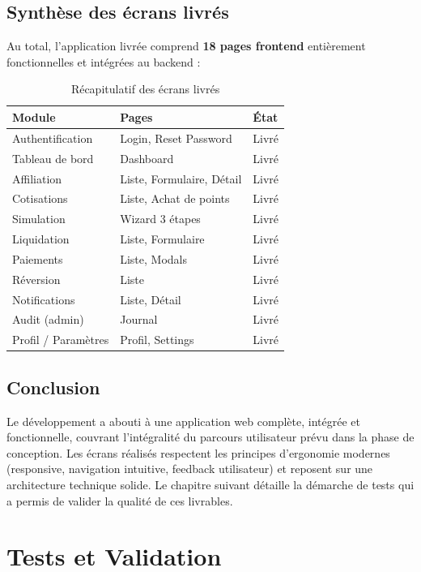 \documentclass[12pt,a4paper,oneside]{report}
\begin{document}
\section{Synthèse des écrans livrés}

Au total, l'application livrée comprend \textbf{18 pages frontend} entièrement fonctionnelles et intégrées au backend :

\begin{table}[H]
\centering
\caption{Récapitulatif des écrans livrés}
\begin{tabular}{lll}
\toprule
\textbf{Module} & \textbf{Pages} & \textbf{État} \\
\midrule
Authentification & Login, Reset Password & Livré \\
Tableau de bord & Dashboard & Livré \\
Affiliation & Liste, Formulaire, Détail & Livré \\
Cotisations & Liste, Achat de points & Livré \\
Simulation & Wizard 3 étapes & Livré \\
Liquidation & Liste, Formulaire & Livré \\
Paiements & Liste, Modals & Livré \\
Réversion & Liste & Livré \\
Notifications & Liste, Détail & Livré \\
Audit (admin) & Journal & Livré \\
Profil / Paramètres & Profil, Settings & Livré \\
\bottomrule
\end{tabular}
\end{table}

\section{Conclusion}
Le développement a abouti à une application web complète, intégrée et fonctionnelle, couvrant l'intégralité du parcours utilisateur prévu dans la phase de conception. Les écrans réalisés respectent les principes d'ergonomie modernes (responsive, navigation intuitive, feedback utilisateur) et reposent sur une architecture technique solide. Le chapitre suivant détaille la démarche de tests qui a permis de valider la qualité de ces livrables.

\chapter{Tests et Validation}
\end{document}
